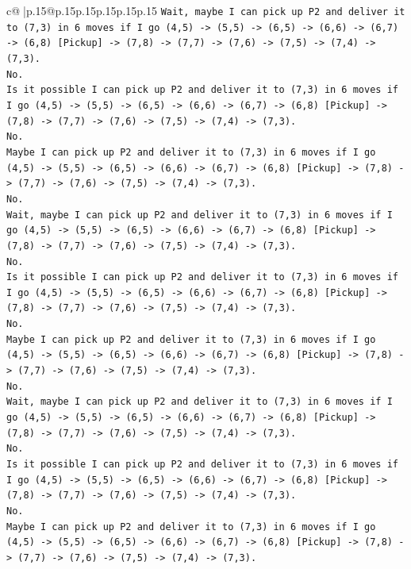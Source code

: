 \documentclass{article}
\begin{document}
{\begin{supertabular}{c@{$\;$}|p{.15\linewidth}@{}p{.15\linewidth}p{.15\linewidth}p{.15\linewidth}p{.15\linewidth}p{.15\linewidth}}
{{{\texttt{Wait, maybe I can pick up P2 and deliver it to (7,3) in 6 moves if I go (4,5) {-}> (5,5) {-}> (6,5) {-}> (6,6) {-}> (6,7) {-}> (6,8) {[}Pickup{]} {-}> (7,8) {-}> (7,7) {-}> (7,6) {-}> (7,5) {-}> (7,4) {-}> (7,3).} \\
\texttt{No.} \\
\texttt{Is it possible I can pick up P2 and deliver it to (7,3) in 6 moves if I go (4,5) {-}> (5,5) {-}> (6,5) {-}> (6,6) {-}> (6,7) {-}> (6,8) {[}Pickup{]} {-}> (7,8) {-}> (7,7) {-}> (7,6) {-}> (7,5) {-}> (7,4) {-}> (7,3).} \\
\texttt{No.} \\
\texttt{Maybe I can pick up P2 and deliver it to (7,3) in 6 moves if I go (4,5) {-}> (5,5) {-}> (6,5) {-}> (6,6) {-}> (6,7) {-}> (6,8) {[}Pickup{]} {-}> (7,8) {-}> (7,7) {-}> (7,6) {-}> (7,5) {-}> (7,4) {-}> (7,3).} \\
\texttt{No.} \\
\texttt{Wait, maybe I can pick up P2 and deliver it to (7,3) in 6 moves if I go (4,5) {-}> (5,5) {-}> (6,5) {-}> (6,6) {-}> (6,7) {-}> (6,8) {[}Pickup{]} {-}> (7,8) {-}> (7,7) {-}> (7,6) {-}> (7,5) {-}> (7,4) {-}> (7,3).} \\
\texttt{No.} \\
\texttt{Is it possible I can pick up P2 and deliver it to (7,3) in 6 moves if I go (4,5) {-}> (5,5) {-}> (6,5) {-}> (6,6) {-}> (6,7) {-}> (6,8) {[}Pickup{]} {-}> (7,8) {-}> (7,7) {-}> (7,6) {-}> (7,5) {-}> (7,4) {-}> (7,3).} \\
\texttt{No.} \\
\texttt{Maybe I can pick up P2 and deliver it to (7,3) in 6 moves if I go (4,5) {-}> (5,5) {-}> (6,5) {-}> (6,6) {-}> (6,7) {-}> (6,8) {[}Pickup{]} {-}> (7,8) {-}> (7,7) {-}> (7,6) {-}> (7,5) {-}> (7,4) {-}> (7,3).} \\
\texttt{No.} \\
\texttt{Wait, maybe I can pick up P2 and deliver it to (7,3) in 6 moves if I go (4,5) {-}> (5,5) {-}> (6,5) {-}> (6,6) {-}> (6,7) {-}> (6,8) {[}Pickup{]} {-}> (7,8) {-}> (7,7) {-}> (7,6) {-}> (7,5) {-}> (7,4) {-}> (7,3).} \\
\texttt{No.} \\
\texttt{Is it possible I can pick up P2 and deliver it to (7,3) in 6 moves if I go (4,5) {-}> (5,5) {-}> (6,5) {-}> (6,6) {-}> (6,7) {-}> (6,8) {[}Pickup{]} {-}> (7,8) {-}> (7,7) {-}> (7,6) {-}> (7,5) {-}> (7,4) {-}> (7,3).} \\
\texttt{No.} \\
\texttt{Maybe I can pick up P2 and deliver it to (7,3) in 6 moves if I go (4,5) {-}> (5,5) {-}> (6,5) {-}> (6,6) {-}> (6,7) {-}> (6,8) {[}Pickup{]} {-}> (7,8) {-}> (7,7) {-}> (7,6) {-}> (7,5) {-}> (7,4) {-}> (7,3).} \\
}}}
\end{supertabular}}
\end{document}
